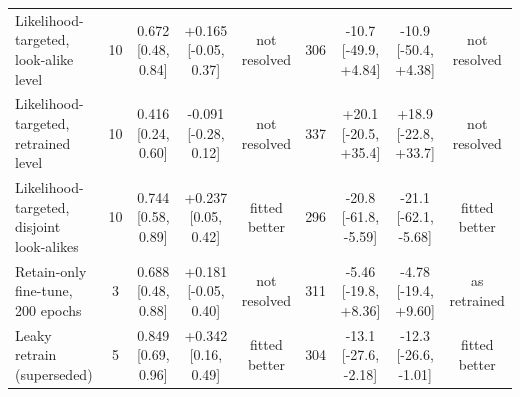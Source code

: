 \begin{tabular}{lcccccccc}
Likelihood-targeted, look-alike level & 10 & 0.672 [0.48, 0.84] & +0.165 [-0.05, 0.37] & not resolved & 306 & -10.7 [-49.9, +4.84] & -10.9 [-50.4, +4.38] & not resolved \\
Likelihood-targeted, retrained level & 10 & 0.416 [0.24, 0.60] & -0.091 [-0.28, 0.12] & not resolved & 337 & +20.1 [-20.5, +35.4] & +18.9 [-22.8, +33.7] & not resolved \\
Likelihood-targeted, disjoint look-alikes & 10 & 0.744 [0.58, 0.89] & +0.237 [0.05, 0.42] & fitted better & 296 & -20.8 [-61.8, -5.59] & -21.1 [-62.1, -5.68] & fitted better \\
Retain-only fine-tune, 200 epochs & 3 & 0.688 [0.48, 0.88] & +0.181 [-0.05, 0.40] & not resolved & 311 & -5.46 [-19.8, +8.36] & -4.78 [-19.4, +9.60] & as retrained \\
Leaky retrain (superseded) & 5 & 0.849 [0.69, 0.96] & +0.342 [0.16, 0.49] & fitted better & 304 & -13.1 [-27.6, -2.18] & -12.3 [-26.6, -1.01] & fitted better \\
\bottomrule
\end{tabular}
